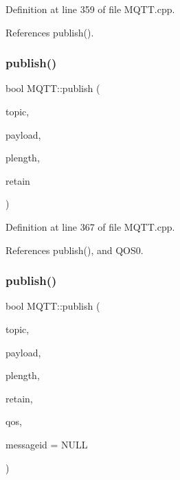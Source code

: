 Definition at line 359 of file M\+Q\+T\+T.\+cpp.



References publish().

\mbox{\label{class_m_q_t_t_ac827a753cde9ed29783dc60092990072}} 
\subsubsection{\texorpdfstring{publish()}{publish()}\hspace{0.1cm}{\footnotesize\ttfamily [8/10]}}
{\footnotesize\ttfamily bool M\+Q\+T\+T\+::publish (\begin{DoxyParamCaption}\item[{const char $\ast$}]{topic,  }\item[{const uint8\+\_\+t $\ast$}]{payload,  }\item[{unsigned int}]{plength,  }\item[{bool}]{retain }\end{DoxyParamCaption})}



Definition at line 367 of file M\+Q\+T\+T.\+cpp.



References publish(), and Q\+O\+S0.

\mbox{\label{class_m_q_t_t_a12d6e2ff5b2aadb36e2fd7abed4fa46b}} 
\subsubsection{\texorpdfstring{publish()}{publish()}\hspace{0.1cm}{\footnotesize\ttfamily [9/10]}}
{\footnotesize\ttfamily bool M\+Q\+T\+T\+::publish (\begin{DoxyParamCaption}\item[{const char $\ast$}]{topic,  }\item[{const uint8\+\_\+t $\ast$}]{payload,  }\item[{unsigned int}]{plength,  }\item[{bool}]{retain,  }\item[{\hyperlink{class_m_q_t_t_aff501e08e20ebf26b3272fcc0e7215ff}{E\+M\+Q\+T\+T\+\_\+\+Q\+OS}}]{qos,  }\item[{uint16\+\_\+t $\ast$}]{messageid = {\ttfamily NULL} }\end{DoxyParamCaption})}



